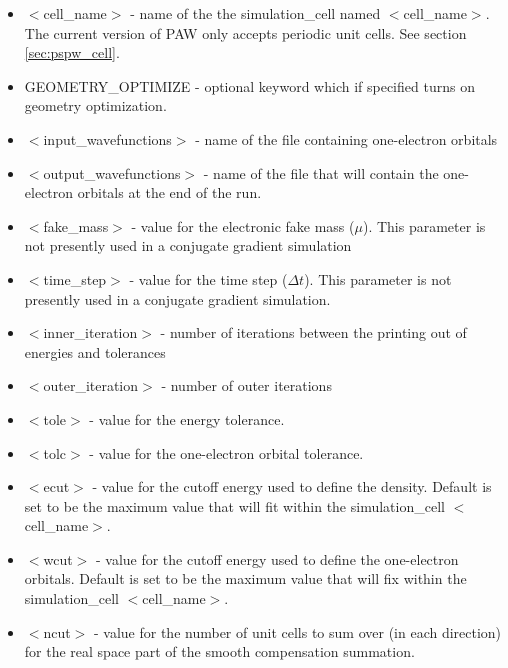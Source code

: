 \begin{itemize}
        \item $<$cell\_name$>$ - name of the
              the simulation\_cell named $<$cell\_name$>$. The
              current version of PAW only accepts periodic unit cells.  
              See section \ref{sec:pspw_cell}.
        \item GEOMETRY\_OPTIMIZE - optional keyword which if specified
              turns on geometry optimization.   
        \item $<$input\_wavefunctions$>$ - name of the
              file containing one-electron orbitals
        \item $<$output\_wavefunctions$>$ - name of the
              file that will contain the one-electron orbitals at the
              end of the run. 
        \item $<$fake\_mass$>$ - value for the electronic
              fake mass ($\mu$). This parameter is not presently used in a 
              conjugate gradient simulation
        \item $<$time\_step$>$ - value for the time step ($\Delta t$).  This
              parameter is not presently used in a conjugate gradient simulation.
        \item $<$inner\_iteration$>$ - number of iterations between the 
              printing out of energies and tolerances
        \item $<$outer\_iteration$>$ - number of outer iterations
        \item $<$tole$>$ - value for the energy tolerance.
        \item $<$tolc$>$ - value for the one-electron orbital tolerance.
        \item $<$ecut$>$ - value for the cutoff energy used
                           to define the density. Default is set
                           to be the maximum value that will fit
                            within the simulation\_cell $<$cell\_name$>$.
        \item $<$wcut$>$ - value for the cutoff energy used
                           to define the one-electron orbitals.
                           Default is set to be the maximum value that 
                           will fix within the simulation\_cell $<$cell\_name$>$.
        \item $<$ncut$>$ - value for the number of unit cells
                          to sum over (in each direction) for the real space
                          part of the smooth compensation summation. 

\end{itemize}
